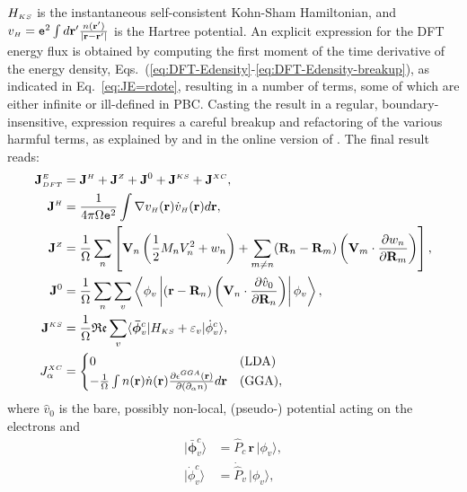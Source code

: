 $H_{\scriptscriptstyle KS}$ is the instantaneous self-consistent Kohn-Sham Hamiltonian, and $v_{\scriptscriptstyle H} = \mathtt{e}^2 \int d\mathbf{r}' \frac{n(\mathbf{r}')}{|\mathbf{r}-\mathbf{r}'|}$ is the Hartree potential. An explicit expression for the DFT energy flux is obtained by computing the first moment of the time derivative of the energy density, Eqs.~(\ref{eq:DFT-Edensity}-\ref{eq:DFT-Edensity-breakup}), as indicated in Eq.~\eqref{eq:JE=rdote}, resulting in a number of terms, some of which are either infinite or ill-defined in PBC. Casting the result in a regular, boundary-insensitive, expression requires a careful breakup and refactoring of the various harmful terms, as explained by \cite{Marcolongo2014} and in the online version of \cite{Marcolongo2016}. The final result reads:
\begin{align}
  \allowdisplaybreaks
  \mathbf{J}^\smallE_{\smallDFT} &=\mathbf{J}^{\smallH} + \mathbf{J}^{\smallZ} + \mathbf{J}^{0} + \mathbf{J}^{\smallKS} +  \mathbf{J}^{\smallXC}, \\
  \mathbf{J}^{\smallH} &=
  \frac{1}{4\pi \rOmega \mathtt{e}^2}\int \nabla v_{\smallH}(\mathbf r) \dot v_{\smallH}(\mathbf  r) d\mathbf{r}, \\
  \mathbf{J}^{\smallZ} \label{eq:DFT-ionic} &=
  \frac{1}{\rOmega} \sum_{n}  \left[\mathbf{V}_{n}\left(\frac{1}{2}M_{n}V_{n}^{2} + w_{n}\right) + \sum_{m\ne n}(\mathbf{R}_{n} - \mathbf{R}_{m}) \left(\mathbf{V}_{m} \cdot \frac {\partial w_{n}}{\partial \mathbf{R}_{m}} \right) \right], \\
  \mathbf{J}^{0}  &=
  \frac{1}{\rOmega}  \sum_{n} \sum_{v}\left\langle \phi_{v} \left|(\mathbf{r}-\mathbf{R}_{n})\left(\mathbf{V}_{n}\cdot\frac{\partial\hat{v}_{0}}{\partial\mathbf{R}_{n}}\right)\right| \phi_{v}\right\rangle, \\
  \mathbf{J}^{\smallKS} &= \label{eq:DFT-KS}
  \frac{1}{\rOmega}  \mathfrak{Re} \sum_{v} \langle \bm{\bar \phi}_v^c | H_{\smallKS}+\varepsilon_v | \dot \phi_v^c \rangle, \\
  J_\alpha^{\smallXC} &=
  \begin{cases}
    0 & \mathrm{(LDA)} \\
      -\frac{1}{\rOmega} \int n(\mathbf{r}) \dot{n}(\mathbf{r}) \frac{\partial\epsilon^{\smallGGA} (\mathbf{r})}{\partial(\partial_\alpha n)} d\mathbf{r} & \mathrm{(GGA)},
  \end{cases}
\end{align}
where  $\hat v_0$ is the bare, possibly non-local, (pseudo-) potential acting on the electrons and
\begin{align}
  |\bm{\bar \phi}_v^c\rangle &= \hat P_c \,\mathbf{r}  \,|\phi_v \rangle, \label{eq:r-times-phi} \\
  |\dot \phi_v^c\rangle &= \dot{\hat P}_v \,|\phi_v\rangle, \label{eq:phi-dot}
\end{align}
